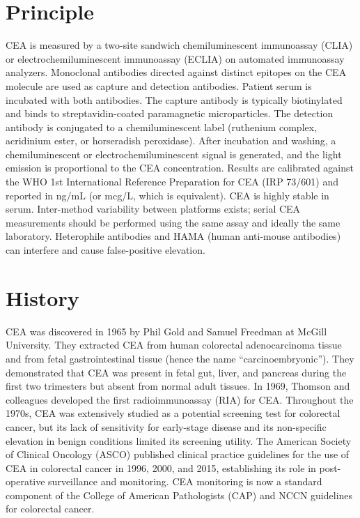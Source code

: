 \section*{Principle}
CEA is measured by a two-site sandwich chemiluminescent immunoassay (CLIA) or electrochemiluminescent immunoassay (ECLIA) on automated immunoassay analyzers. Monoclonal antibodies directed against distinct epitopes on the CEA molecule are used as capture and detection antibodies. Patient serum is incubated with both antibodies. The capture antibody is typically biotinylated and binds to streptavidin-coated paramagnetic microparticles. The detection antibody is conjugated to a chemiluminescent label (ruthenium complex, acridinium ester, or horseradish peroxidase). After incubation and washing, a chemiluminescent or electrochemiluminescent signal is generated, and the light emission is proportional to the CEA concentration. Results are calibrated against the WHO 1st International Reference Preparation for CEA (IRP 73/601) and reported in ng/mL (or mcg/L, which is equivalent). CEA is highly stable in serum. Inter-method variability between platforms exists; serial CEA measurements should be performed using the same assay and ideally the same laboratory. Heterophile antibodies and HAMA (human anti-mouse antibodies) can interfere and cause false-positive elevation.

\section*{History}
CEA was discovered in 1965 by Phil Gold and Samuel Freedman at McGill University. They extracted CEA from human colorectal adenocarcinoma tissue and from fetal gastrointestinal tissue (hence the name ``carcinoembryonic''). They demonstrated that CEA was present in fetal gut, liver, and pancreas during the first two trimesters but absent from normal adult tissues. In 1969, Thomson and colleagues developed the first radioimmunoassay (RIA) for CEA. Throughout the 1970s, CEA was extensively studied as a potential screening test for colorectal cancer, but its lack of sensitivity for early-stage disease and its non-specific elevation in benign conditions limited its screening utility. The American Society of Clinical Oncology (ASCO) published clinical practice guidelines for the use of CEA in colorectal cancer in 1996, 2000, and 2015, establishing its role in post-operative surveillance and monitoring. CEA monitoring is now a standard component of the College of American Pathologists (CAP) and NCCN guidelines for colorectal cancer.

